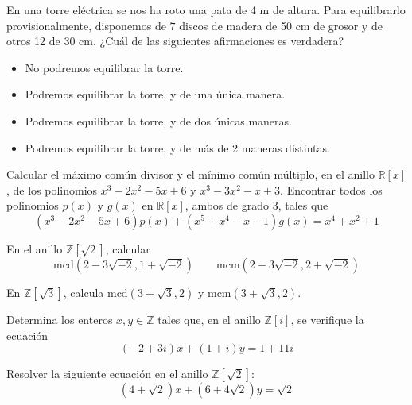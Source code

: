\begin{ejercicio}
    En una torre eléctrica se nos ha roto una pata de 4 m de altura. Para equilibrarlo provisionalmente, disponemos de 7 discos de madera de 50 cm de grosor y de otros 12 de 30 cm. ¿Cuál de las siguientes afirmaciones es verdadera?
    \begin{itemize}
        \item No podremos equilibrar la torre.
        \item Podremos equilibrar la torre, y de una única manera.
        \item Podremos equilibrar la torre, y de dos únicas maneras.
        \item Podremos equilibrar la torre, y de más de 2 maneras distintas.
    \end{itemize}
\end{ejercicio}

\begin{ejercicio}
    Calcular el máximo común divisor y el mínimo común múltiplo, en el anillo $\mathbb{R}[x]$, de los polinomios $x^3-2x^2-5x+6$ y $x^3-3x^2-x+3$. Encontrar todos los polinomios $p(x)$ y $g(x)$ en $\mathbb{R}[x]$, ambos de grado 3, tales que
    \begin{equation*}
        (x^3-2x^2-5x+6)p(x)+(x^5+x^4-x-1)g(x) = x^4 + x^2+1
    \end{equation*}
\end{ejercicio}

\begin{ejercicio}
    En el anillo $\mathbb{Z}\left[\sqrt{2}\right]$, calcular
    \begin{equation*}
        \text{mcd}\left(2-3\sqrt{-2}, 1+\sqrt{-2}\right)\qquad \text{mcm}\left(2-3\sqrt{-2},2+\sqrt{-2}\right)
    \end{equation*}
\end{ejercicio}

\begin{ejercicio}
    En $\mathbb{Z}\left[\sqrt{3}\right]$, calcula $\text{mcd}(3+\sqrt{3},2)$ y $\text{mcm}(3+\sqrt{3},2)$.
\end{ejercicio}

\begin{ejercicio}
    Determina los enteros $x,y\in \mathbb{Z}$ tales que, en el anillo $\mathbb{Z}[i]$, se verifique la ecuación 
    \begin{equation*}
        (-2+3i)x + (1+i)y = 1 + 11i
    \end{equation*}
\end{ejercicio}

\begin{ejercicio}
    Resolver la siguiente ecuación en el anillo $\mathbb{Z}\left[\sqrt{2}\right]$:
    \begin{equation*}
        (4+\sqrt{2})x+(6+4\sqrt{2})y = \sqrt{2}
    \end{equation*}
\end{ejercicio}

\resetearcontador
\newpage
